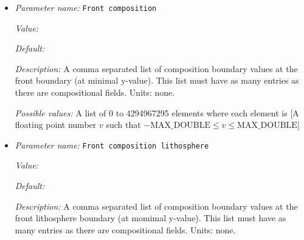\begin{itemize}
{\it Value:} 


{\it Default:} 


{\it Description:} A comma separated list of composition boundary values at the bottom boundary (at minimal y-value in 2d, or minimal z-value in 3d). This list must have as many entries as there are compositional fields. Units: none.


{\it Possible values:} A list of 0 to 4294967295 elements where each element is [A floating point number $v$ such that $-\text{MAX\_DOUBLE} \leq v \leq \text{MAX\_DOUBLE}$]
\item {\it Parameter name:} {\tt Front composition}
\label{parameters:Boundary composition model/Box with lithosphere boundary indicators/Front composition}
\label{parameters:Boundary_20composition_20model/Box_20with_20lithosphere_20boundary_20indicators/Front_20composition}


{\it Value:} 


{\it Default:} 


{\it Description:} A comma separated list of composition boundary values at the front boundary (at minimal y-value). This list must have as many entries as there are compositional fields. Units: none.


{\it Possible values:} A list of 0 to 4294967295 elements where each element is [A floating point number $v$ such that $-\text{MAX\_DOUBLE} \leq v \leq \text{MAX\_DOUBLE}$]
\item {\it Parameter name:} {\tt Front composition lithosphere}
\label{parameters:Boundary composition model/Box with lithosphere boundary indicators/Front composition lithosphere}
\label{parameters:Boundary_20composition_20model/Box_20with_20lithosphere_20boundary_20indicators/Front_20composition_20lithosphere}


{\it Value:} 


{\it Default:} 


{\it Description:} A comma separated list of composition boundary values at the front lithosphere boundary (at momimal y-value). This list must have as many entries as there are compositional fields. Units: none.



\end{itemize}
